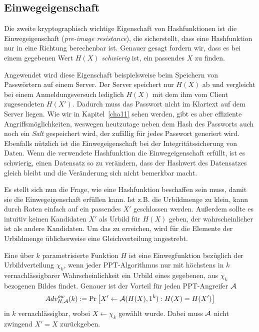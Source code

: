 \subsection{Einwegeigenschaft}
Die zweite kryptographisch wichtige Eigenschaft von Hashfunktionen ist die Einwegeigenschaft (\textit{pre-image resistance}), die sicherstellt,
dass eine Hashfunktion nur in eine Richtung berechenbar ist. Genauer gesagt fordern wir, dass es bei einem gegebenen Wert $H(X)$ \emph{schwierig} ist, ein
passendes $X$ zu finden.

Angewendet wird diese Eigenschaft beispielsweise beim Speichern von Passwörtern auf einem Server. Der Server speichert nur $H(X)$ ab und vergleicht bei
einem Anmeldungsversuch lediglich $H(X)$ mit dem ihm vom Client zugesendeten $H(X')$. Dadurch muss das Passwort nicht im Klartext auf dem Server liegen. Wie wir in Kapitel~\ref{cha11} sehen werden, gibt es aber effiziente Angriffsmöglichkeiten, weswegen heutzutage neben dem Hash des Passworts auch noch ein \emph{Salt} gespeichert wird, der zufällig für jedes Passwort generiert wird. 
Ebenfalls nützlich ist die Einwegeigenschaft bei der Integritätssicherung von Daten. Wenn die verwendete Hashfunktion die Einwegeigenschaft erfüllt, ist
es schwierig, einen Datensatz so zu verändern, dass der Hashwert des Datensatzes gleich bleibt und die Veränderung sich nicht bemerkbar macht.

Es stellt sich nun die Frage, wie eine Hashfunktion beschaffen sein muss, damit sie die Einwegeigenschaft erfüllen kann. Ist z.B. die Urbildmenge zu klein, kann
durch Raten einfach auf ein passendes $X'$ geschlossen werden. Außerdem sollte es intuitiv keinen Kandidaten $X'$ als Urbild für $H(X)$ geben, der
wahrscheinlicher ist als andere Kandidaten. Um das zu erreichen, wird für die Elemente der Urbildmenge üblicherweise eine Gleichverteilung angestrebt.
\vspace{10pt}

\begin{definition}[Einwegfunktion]
Eine über $k$ parametrisierte Funktion $H$ ist eine Einwegfunktion bezüglich der Urbildverteilung $\chi_k$, wenn jeder PPT-Algorithmus nur mit höchstens
in $k$ vernachlässigbarer Wahrscheinlichkeit ein Urbild eines gegebenen, aus $\chi_k$ bezogenen Bildes findet. Genauer ist der Vorteil für jeden PPT-Angreifer $\mathcal{A}$
\begin{equation*}
Adv^{ow}_{H,\mathcal{A}}(k):= \Pr \left[ X' \leftarrow \mathcal{A}(H(X), 1^k) : H(X) = H(X')\right]
\end{equation*}
in $k$ vernachlässigbar, wobei $X \leftarrow \chi_k$ gewählt wurde. Dabei muss $\mathcal{A}$ nicht zwingend $X' = X$ zurückgeben.
\end{definition}

